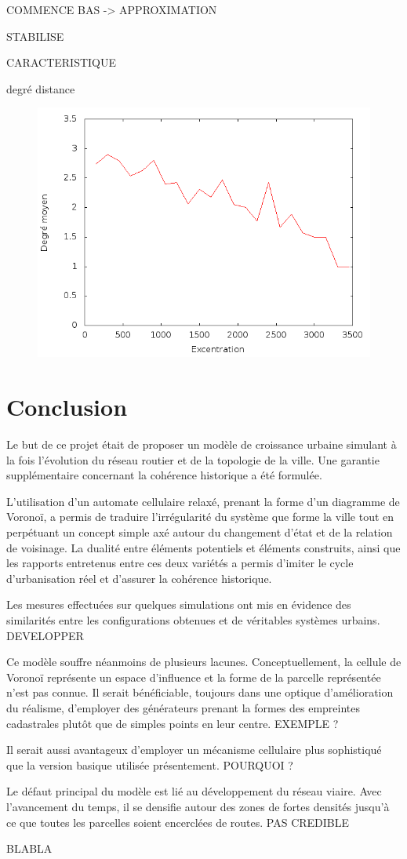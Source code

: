 \documentclass[12pt]{article}
\begin{document}
COMMENCE BAS -> APPROXIMATION

STABILISE

CARACTERISTIQUE

degré distance

\begin{figure}[H]
  \centering
  \includegraphics[width=.8\linewidth]{images/degree_distance.png}
  \caption{}
\end{figure}

\section{Conclusion}

Le but de ce projet était de proposer un modèle de croissance urbaine
simulant à la fois l'évolution du réseau routier et de la topologie de
la ville. Une garantie supplémentaire concernant la cohérence
historique a été formulée.

L'utilisation d'un automate cellulaire relaxé, prenant la forme d'un
diagramme de Voronoï, a permis de traduire l'irrégularité du système
que forme la ville tout en perpétuant un concept simple axé autour du
changement d'état et de la relation de voisinage. La dualité entre
éléments potentiels et éléments construits, ainsi que les rapports
entretenus entre ces deux variétés a permis d'imiter le cycle
d'urbanisation réel et d'assurer la cohérence historique.

Les mesures effectuées sur quelques simulations ont mis en évidence
des similarités entre les configurations obtenues et de véritables
systèmes urbains. DEVELOPPER

Ce modèle souffre néanmoins de plusieurs lacunes. Conceptuellement, la
cellule de Voronoï représente un espace d'influence et la forme de la
parcelle représentée n'est pas connue. Il serait bénéficiable,
toujours dans une optique d'amélioration du réalisme, d'employer des
générateurs prenant la formes des empreintes cadastrales plutôt que de
simples points en leur centre. EXEMPLE ?

Il serait aussi avantageux d'employer un mécanisme cellulaire plus
sophistiqué que la version basique utilisée présentement. POURQUOI ?

Le défaut principal du modèle est lié au développement du réseau
viaire. Avec l'avancement du temps, il se densifie autour des zones de
fortes densités jusqu'à ce que toutes les parcelles soient encerclées
de routes. PAS CREDIBLE

BLABLA

\printbibliography
\end{document}
